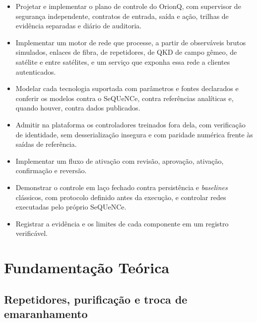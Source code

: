 \documentclass[12pt]{article}
\begin{document}
\begin{itemize}
  \item Projetar e implementar o plano de controle do OrionQ, com supervisor de
        segurança independente, contratos de entrada, saída e ação, trilhas de
        evidência separadas e diário de auditoria.
  \item Implementar um motor de rede que processe, a partir de observáveis
        brutos simulados, enlaces de fibra, de repetidores, de QKD de campo
        gêmeo, de satélite e entre satélites, e um serviço que exponha essa rede
        a clientes autenticados.
  \item Modelar cada tecnologia suportada com parâmetros e fontes declarados e
        conferir os modelos contra o SeQUeNCe, contra referências analíticas e,
        quando houver, contra dados publicados.
  \item Admitir na plataforma os controladores treinados fora dela, com
        verificação de identidade, sem desserialização insegura e com paridade
        numérica frente às saídas de referência.
  \item Implementar um fluxo de ativação com revisão, aprovação, ativação,
        confirmação e reversão.
  \item Demonstrar o controle em laço fechado contra persistência e
        \textit{baselines} clássicos, com protocolo definido antes da execução,
        e controlar redes executadas pelo próprio SeQUeNCe.
  \item Registrar a evidência e os limites de cada componente em um registro
        verificável.
\end{itemize}

\section{Fundamentação Teórica}

\subsection{Repetidores, purificação e troca de emaranhamento}
\end{document}
